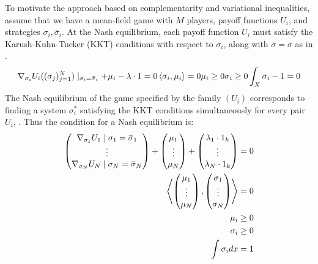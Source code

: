 To motivate the approach based on complementarity and variational inequalities, assume that we have a mean-field game with $M$ players, payoff functions $U_i$, and strategies $\sigma_i, \overbar{\sigma}_i$. At the Nash equilibrium, each payoff function $U_i$ must satisfy the Karush-Kuhn-Tucker (KKT) conditions with respect to $\sigma_i$, along with $\overbar{\sigma}=\sigma$ as in .
\begin{align}
  \nabla_{\sigma_i}U_i((\sigma_j)_{j=1}^N) \mid_{\sigma_i = \overbar{\sigma}_i}  + \mu_i - \lambda \cdot 1 = 0
  \ip{\sigma_i}{\mu_i} = 0
  \mu_i \geq 0
  \sigma_i \geq 0
  \int_X \sigma_i - 1 = 0
\end{align}
The Nash equilibrium of the game specified by the family $(U_i)$ corresponds to finding a system $\sigma_i^*$ satisfying the KKT conditions simultaneously for every pair $U_i$, \citep{deimling2010nonlinear}. Thus the condition for a Nash equilibrium is:
\begin{equation}
  \begin{split}
  \begin{pmatrix}
    \nabla_{\sigma_1} U_1 \mid{\sigma_1 = \overbar{\sigma}_1} \\
    \vdots \\
    \nabla_{\sigma_N} U_N \mid{\sigma_N = \overbar{\sigma}_N}
\end{pmatrix} + \begin{pmatrix}
    \mu_1 \\
    \vdots \\
    \mu_N
\end{pmatrix} + \begin{pmatrix}
    \lambda_1 \cdot 1_k \\
    \vdots \\
    \lambda_N \cdot 1_k
\end{pmatrix} = 0 \\
\ip{
\begin{pmatrix}
  \mu_1 \\
  \vdots \\
  \mu_N
\end{pmatrix}}{ \begin{pmatrix}
  \sigma_1 \\
  \vdots \\
  \sigma_N
\end{pmatrix}} = 0 \\
\mu_i \geq 0 \\
  \sigma_i \geq 0 \\
    \int \sigma_i dx = 1
    \label{eq:KKT_total}
  \end{split}
\end{equation}
